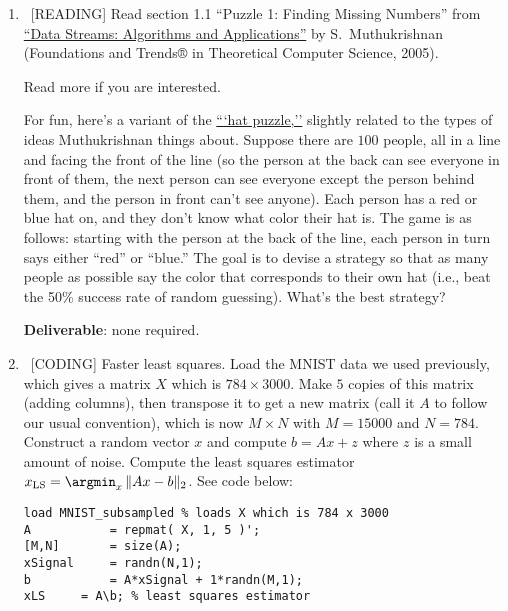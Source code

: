 \documentclass[10pt, letterpaper]{scrartcl}
\begin{document}
\begin{enumerate}[align=left, leftmargin=*, label=\sffamily\bfseries Problem \arabic*:]   
 
    \item \ [READING] Read section 1.1 ``Puzzle 1: Finding Missing Numbers'' from
    \href{http://citeseerx.ist.psu.edu/viewdoc/download?doi=10.1.1.440.5344&rep=rep1&type=pdf}{``Data Streams: Algorithms and Applications''} by S.\ Muthukrishnan (Foundations and Trends® in Theoretical Computer Science, 2005).
    
    Read more if you are interested.
    
    For fun, here's a variant of the  \href{https://en.wikipedia.org/wiki/Hat_puzzle}{```hat puzzle,''} slightly related to the types of ideas Muthukrishnan things about. Suppose there are $100$ people, all in a line and facing the front of the line (so the person at the back can see everyone in front of them, the next person can see everyone except the person behind them, and the person in front can't see anyone).  Each person has a red or blue hat on, and they don't know what color their hat is. The game is as follows: starting with the person at the back of the line, each person in turn says either ``red'' or ``blue.'' The goal is to devise a strategy so that as many people as possible say the color that corresponds to their own hat (i.e., beat the 50\% success rate of random guessing). What's the best strategy?
    
    \textbf{Deliverable}: none required.
    
    
    \item \ [CODING] Faster least squares.  Load the MNIST data we used previously, which gives a matrix $X$ which is $784\times  3000$. Make $5$ copies of this matrix (adding columns), then transpose it to get a new matrix (call it $A$ to follow our usual convention), which is now $M \times N$ with $M = 15000$ and $N=784$. Construct a random vector $x$ and compute $b=Ax+z$ where $z$ is a small amount of noise.  Compute the least squares estimator $x_\text{LS} = \argmin_{x}\, \|Ax-b\|_2$.
    See code below:
\begin{lstlisting}
load MNIST_subsampled % loads X which is 784 x 3000
A           = repmat( X, 1, 5 )';
[M,N]       = size(A);
xSignal     = randn(N,1);
b           = A*xSignal + 1*randn(M,1);
xLS	    = A\b; % least squares estimator
\end{lstlisting}
    

\end{enumerate}
\end{document}
